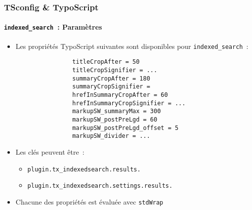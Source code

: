 \begin{frame}[fragile]
	\frametitle{TSconfig \& TypoScript}
	\framesubtitle{\texttt{indexed\_search}~: Paramètres}

	\lstset{basicstyle=\tiny\ttfamily}

	\begin{itemize}
		\item Les propriétés TypoScript suivantes sont disponibles pour \texttt{indexed\_search}~:

			\begin{lstlisting}
				titleCropAfter = 50
				titleCropSignifier = ...
				summaryCropAfter = 180
				summaryCropSignifier =
				hrefInSummaryCropAfter = 60
				hrefInSummaryCropSignifier = ...
				markupSW_summaryMax = 300
				markupSW_postPreLgd = 60
				markupSW_postPreLgd_offset = 5
				markupSW_divider = ...
			\end{lstlisting}

		\item Les clés peuvent être~:
			\begin{itemize}
				\item \texttt{plugin.tx\_indexedsearch.results.}
				\item \texttt{plugin.tx\_indexedsearch.settings.results.}
			\end{itemize}

		\item Chacune des propriétés est évaluée avec \texttt{stdWrap}

	\end{itemize}

\end{frame}

